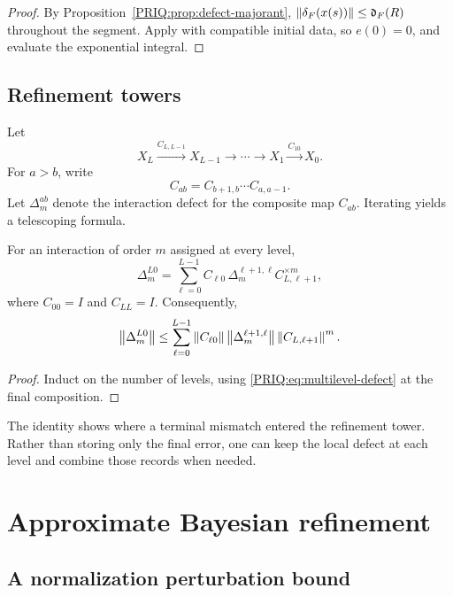 \begin{proof}
By Proposition~\ref{PRIQ:prop:defect-majorant}, $\left\lVert \delta_F(x(s))\right\rVert\leq\mathfrak d_F(R)$ throughout the segment.  Apply  with compatible initial data, so $e(0)=0$, and evaluate the exponential integral.
\end{proof}

\subsection{Refinement towers}
Let
\[
  X_L\xrightarrow{C_{L,L-1}}X_{L-1}
  \longrightarrow\cdots\longrightarrow
  X_1\xrightarrow{C_{10}}X_0.
\]
For $a>b$, write
\[
  C_{ab}=C_{b+1,b}\cdots C_{a,a-1}.
\]
Let $\Delta_m^{ab}$ denote the interaction defect for the composite map $C_{ab}$.  Iterating  yields a telescoping formula.

\begin{PRIQcorollary}\label{PRIQ:cor:tower-defect}
For an interaction of order $m$ assigned at every level,
\begin{equation}\label{PRIQ:eq:tower-defect}
  \Delta_m^{L0}
  =
  \sum_{\ell=0}^{L-1}
  C_{\ell0}\,
  \Delta_m^{\ell+1,\ell}
  C_{L,\ell+1}^{\times m},
\end{equation}
where $C_{00}=I$ and $C_{LL}=I$.  Consequently,
\begin{equation}\label{PRIQ:eq:tower-defect-bound}
  \left\lVert \Delta_m^{L0}\right\rVert
  \leq
  \sum_{\ell=0}^{L-1}
  \left\lVert C_{\ell0}\right\rVert
  \left\lVert \Delta_m^{\ell+1,\ell}\right\rVert
  \left\lVert C_{L,\ell+1}\right\rVert^m.
\end{equation}
\end{PRIQcorollary}

\begin{proof}
Induct on the number of levels, using \eqref{PRIQ:eq:multilevel-defect} at the final composition.
\end{proof}

The identity shows where a terminal mismatch entered the refinement tower.  Rather than storing only the final error, one can keep the local defect at each level and combine those records when needed.

\section{Approximate Bayesian refinement}\label{PRIQ:sec:approx-bayes}

\subsection{A normalization perturbation bound}

